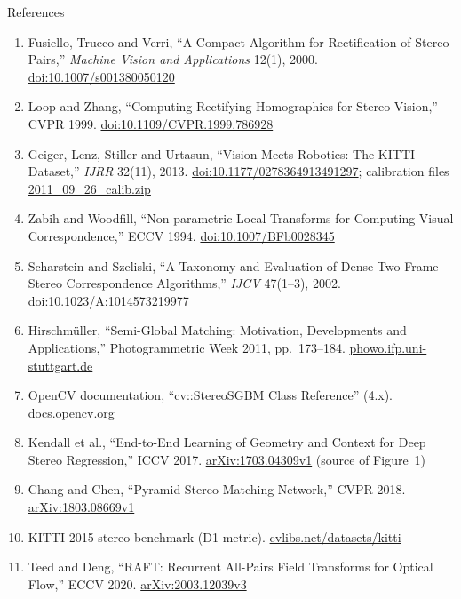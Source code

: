 \begin{frame}[allowframebreaks]{References}
\begin{enumerate}
    \item Fusiello, Trucco and Verri, ``A Compact Algorithm for Rectification of Stereo Pairs,'' \emph{Machine Vision and Applications} 12(1), 2000. \href{https://doi.org/10.1007/s001380050120}{doi:10.1007/s001380050120}
    \item Loop and Zhang, ``Computing Rectifying Homographies for Stereo Vision,'' CVPR 1999. \href{https://doi.org/10.1109/CVPR.1999.786928}{doi:10.1109/CVPR.1999.786928}
    \item Geiger, Lenz, Stiller and Urtasun, ``Vision Meets Robotics: The KITTI Dataset,'' \emph{IJRR} 32(11), 2013. \href{https://doi.org/10.1177/0278364913491297}{doi:10.1177/0278364913491297}; calibration files \href{https://s3.eu-central-1.amazonaws.com/avg-kitti/raw_data/2011_09_26_calib.zip}{2011\_09\_26\_calib.zip}
    \item Zabih and Woodfill, ``Non-parametric Local Transforms for Computing Visual Correspondence,'' ECCV 1994. \href{https://doi.org/10.1007/BFb0028345}{doi:10.1007/BFb0028345}
    \item Scharstein and Szeliski, ``A Taxonomy and Evaluation of Dense Two-Frame Stereo Correspondence Algorithms,'' \emph{IJCV} 47(1--3), 2002. \href{https://doi.org/10.1023/A:1014573219977}{doi:10.1023/A:1014573219977}
    \item Hirschm\"uller, ``Semi-Global Matching: Motivation, Developments and Applications,'' Photogrammetric Week 2011, pp.~173--184. \href{https://phowo.ifp.uni-stuttgart.de/publications/phowo11/180Hirschmueller.pdf}{phowo.ifp.uni-stuttgart.de}
    \item OpenCV documentation, ``cv::StereoSGBM Class Reference'' (4.x). \href{https://docs.opencv.org/4.x/d2/d85/classcv_1_1StereoSGBM.html}{docs.opencv.org}
    \item Kendall et al., ``End-to-End Learning of Geometry and Context for Deep Stereo Regression,'' ICCV 2017. \href{https://arxiv.org/abs/1703.04309v1}{arXiv:1703.04309v1} (source of Figure~1)
    \item Chang and Chen, ``Pyramid Stereo Matching Network,'' CVPR 2018. \href{https://arxiv.org/abs/1803.08669v1}{arXiv:1803.08669v1}
    \item KITTI 2015 stereo benchmark (D1 metric). \href{https://www.cvlibs.net/datasets/kitti/eval_scene_flow.php?benchmark=stereo}{cvlibs.net/datasets/kitti}
    \item Teed and Deng, ``RAFT: Recurrent All-Pairs Field Transforms for Optical Flow,'' ECCV 2020. \href{https://arxiv.org/abs/2003.12039v3}{arXiv:2003.12039v3}

\end{enumerate}
\end{frame}
